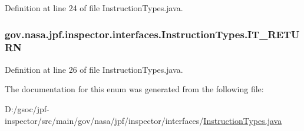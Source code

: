 Definition at line 24 of file Instruction\+Types.\+java.

\subsubsection[{\texorpdfstring{I\+T\+\_\+\+R\+E\+T\+U\+RN}{IT_RETURN}}]{\setlength{\rightskip}{0pt plus 5cm}gov.\+nasa.\+jpf.\+inspector.\+interfaces.\+Instruction\+Types.\+I\+T\+\_\+\+R\+E\+T\+U\+RN}\hypertarget{enumgov_1_1nasa_1_1jpf_1_1inspector_1_1interfaces_1_1_instruction_types_a1a5b50e97394017242d8cbe01b27a4e5}{}\label{enumgov_1_1nasa_1_1jpf_1_1inspector_1_1interfaces_1_1_instruction_types_a1a5b50e97394017242d8cbe01b27a4e5}


Definition at line 26 of file Instruction\+Types.\+java.



The documentation for this enum was generated from the following file\+:\begin{DoxyCompactItemize}
\item 
D\+:/gsoc/jpf-\/inspector/src/main/gov/nasa/jpf/inspector/interfaces/\hyperlink{_instruction_types_8java}{Instruction\+Types.\+java}\end{DoxyCompactItemize}

